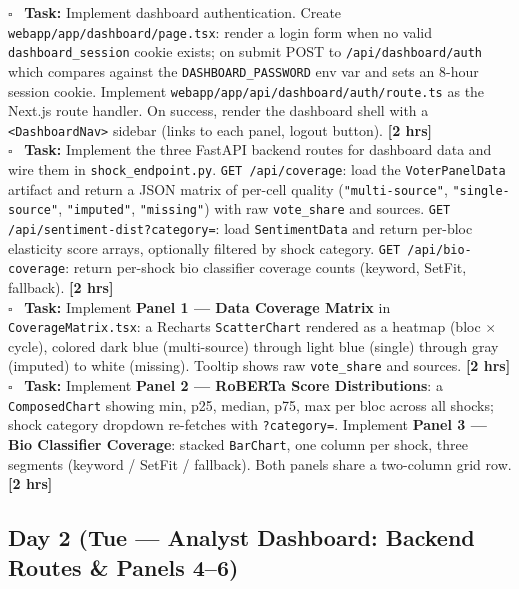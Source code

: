\documentclass[11pt]{article}
\newcommand{\hrs}[1]{\textbf{[#1 hrs]}}
\newcommand{\dayhead}[2]{%
  \subsection*{Day #1 \normalfont\small\color{codegray}(#2)}}
\newcommand{\task}[2]{%
  \noindent\textbf{Task:} #1 \hfill \hrs{#2}\\}
\newcommand{\done}{\textcolor{sectionblue}{$\square$}\ }
\begin{document}
\begin{taskbox}
\done \task{Implement dashboard authentication. Create
  \texttt{webapp/app/dashboard/page.tsx}: render a login form when no valid
  \texttt{dashboard\_session} cookie exists; on submit POST to
  \texttt{/api/dashboard/auth} which compares against the
  \texttt{DASHBOARD\_PASSWORD} env var and sets an 8-hour session cookie.
  Implement \texttt{webapp/app/api/dashboard/auth/route.ts} as the Next.js
  route handler. On success, render the dashboard shell with a
  \texttt{<DashboardNav>} sidebar (links to each panel, logout button).}{2}

\done \task{Implement the three FastAPI backend routes for dashboard data and
  wire them in \texttt{shock\_endpoint.py}. \texttt{GET /api/coverage}: load
  the \texttt{VoterPanelData} artifact and return a JSON matrix of per-cell
  quality (\texttt{"multi-source"}, \texttt{"single-source"},
  \texttt{"imputed"}, \texttt{"missing"}) with raw \texttt{vote\_share} and
  sources. \texttt{GET /api/sentiment-dist?category=}: load
  \texttt{SentimentData} and return per-bloc elasticity score arrays,
  optionally filtered by shock category. \texttt{GET /api/bio-coverage}:
  return per-shock bio classifier coverage counts (keyword, SetFit,
  fallback).}{2}

\done \task{Implement \textbf{Panel 1 --- Data Coverage Matrix} in
  \texttt{CoverageMatrix.tsx}: a Recharts \texttt{ScatterChart} rendered
  as a heatmap (bloc $\times$ cycle), colored dark blue (multi-source)
  through light blue (single) through gray (imputed) to white (missing).
  Tooltip shows raw \texttt{vote\_share} and sources.}{2}

\done \task{Implement \textbf{Panel 2 --- RoBERTa Score Distributions}: a
  \texttt{ComposedChart} showing min, p25, median, p75, max per bloc across
  all shocks; shock category dropdown re-fetches with \texttt{?category=}.
  Implement \textbf{Panel 3 --- Bio Classifier Coverage}: stacked
  \texttt{BarChart}, one column per shock, three segments (keyword /
  SetFit / fallback). Both panels share a two-column grid row.}{2}
\end{taskbox}

\dayhead{2}{Tue --- Analyst Dashboard: Backend Routes \& Panels 4--6}
\end{document}
